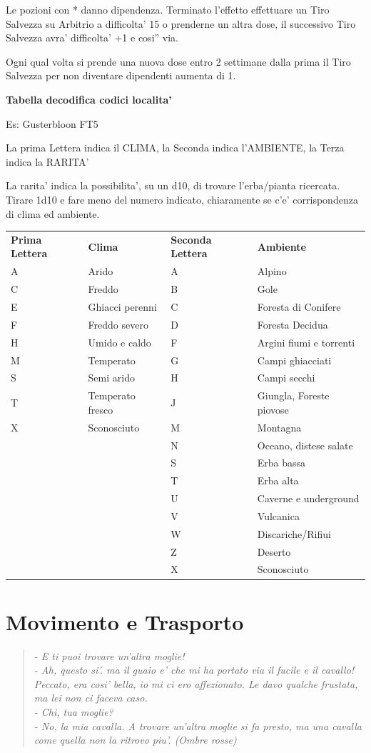 \documentclass[a4paper,11pt,twoside,openany]{book}
\begin{document}
\medskip

Le pozioni con {*} danno dipendenza. Terminato l'effetto effettuare
un Tiro Salvezza su Arbitrio a difficolta' 15 o prenderne un altra
dose, il successivo Tiro Salvezza avra' difficolta' +1 e cosi'' via.

Ogni qual volta si prende una nuova dose entro 2 settimane dalla prima
il Tiro Salvezza per non diventare dipendenti aumenta di 1.

\bigskip

\textbf{Tabella decodifica codici localita'}
\smallskip

Es: Gusterbloon FT5

La prima Lettera indica il CLIMA, la Seconda indica l'AMBIENTE, la
Terza indica la RARITA'

La rarita' indica la possibilita', su un d10, di trovare l'erba/pianta
ricercata. Tirare 1d10 e fare meno del numero indicato, chiaramente
se c'e' corrispondenza di clima ed ambiente.
\bigskip

\begin{tabular}{llll}
\toprule
\textbf{Prima Lettera} & \textbf{Clima}&\textbf{Seconda Lettera} & \textbf{Ambiente}\tabularnewline
A & Arido & A & Alpino\tabularnewline
C & Freddo&B & Gole\tabularnewline
E & Ghiacci perenni&C & Foresta di Conifere\tabularnewline
F & Freddo severo&D & Foresta Decidua\tabularnewline
H & Umido e caldo&F & Argini fiumi e torrenti\tabularnewline
M & Temperato&G & Campi ghiacciati\tabularnewline
S & Semi arido&H & Campi secchi\tabularnewline
T & Temperato fresco&J & Giungla, Foreste piovose\tabularnewline
X & Sconosciuto&M & Montagna\tabularnewline
&&N & Oceano, distese salate\tabularnewline
&&S & Erba bassa\tabularnewline
&&T & Erba alta\tabularnewline
&&U & Caverne e underground\tabularnewline
&&V & Vulcanica\tabularnewline
&&W & Discariche/Rifiui\tabularnewline
&&Z & Deserto\tabularnewline
&&X & Sconosciuto\tabularnewline
\end{tabular}

\pagebreak

\section{Movimento e Trasporto}

\label{movimento-e-trasporto}



\begin{quote}\textit{
- E ti puoi trovare un'altra moglie!\\
- Ah, questo si'. ma il guaio e' che mi ha portato via il fucile e il cavallo! Peccato, era cosi' bella, io mi ci ero affezionato. Le davo qualche frustata, ma lei non ci faceva caso.\\
- Chi, tua moglie?\\
- No, la mia cavalla. A trovare un'altra moglie si fa presto, ma una cavalla come quella non la ritrovo piu'. (Ombre rosse)
}\end{quote}
\end{document}
